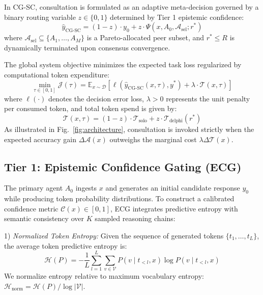 \documentclass[conference]{IEEEtran}
\begin{document}
In CG-SC, consultation is formulated as an adaptive meta-decision governed by a binary routing variable $z \in \{0, 1\}$ determined by Tier 1 epistemic confidence:
\begin{equation}
\hat{y}_{\text{CG-SC}} = (1 - z) \cdot y_0 + z \cdot \Psi(x, A_0, \mathcal{A}_{\text{sel}}; r^*)
\end{equation}
where $\mathcal{A}_{\text{sel}} \subseteq \{A_1, \dots, A_M\}$ is a Pareto-allocated peer subset, and $r^* \le R$ is dynamically terminated upon consensus convergence.

The global system objective minimizes the expected task loss regularized by computational token expenditure:
\begin{equation}
\min_{\tau \in [0, 1]} \mathcal{J}(\tau) = \mathbb{E}_{x \sim \mathcal{D}} \left[ \ell(\hat{y}_{\text{CG-SC}}(x, \tau), y^*) + \lambda \cdot \mathcal{T}(x, \tau) \right]
\end{equation}
where $\ell(\cdot)$ denotes the decision error loss, $\lambda > 0$ represents the unit penalty per consumed token, and total token spend is given by:
\begin{equation}
\mathcal{T}(x, \tau) = (1 - z) \cdot \mathcal{T}_{\text{solo}} + z \cdot \mathcal{T}_{\text{delphi}}(r^*)
\end{equation}
As illustrated in Fig.~\ref{fig:architecture}, consultation is invoked strictly when the expected accuracy gain $\Delta \mathcal{A}(x)$ outweighs the marginal cost $\lambda \Delta \mathcal{T}(x)$.

\subsection{Tier 1: Epistemic Confidence Gating (ECG)}
The primary agent $A_0$ ingests $x$ and generates an initial candidate response $y_0$ while producing token probability distributions. To construct a calibrated confidence metric $\mathcal{C}(x) \in [0, 1]$, ECG integrates predictive entropy with semantic consistency over $K$ sampled reasoning chains:

1) \textit{Normalized Token Entropy:} Given the sequence of generated tokens $\{t_1, \dots, t_L\}$, the average token predictive entropy is:
\begin{equation}
\mathcal{H}(P) = -\frac{1}{L} \sum_{l=1}^L \sum_{v \in \mathcal{V}} P(v \mid t_{<l}, x) \log P(v \mid t_{<l}, x)
\end{equation}
We normalize entropy relative to maximum vocabulary entropy: $\mathcal{H}_{\text{norm}} = \mathcal{H}(P) / \log |\mathcal{V}|$.
\end{document}
